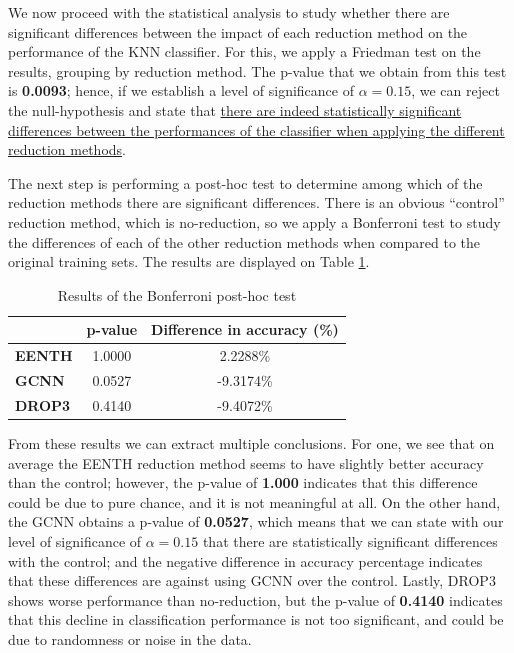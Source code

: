 We now proceed with the statistical analysis to study whether there are significant differences between the impact of each reduction method on the performance of the KNN classifier. For this, we apply a Friedman test on the results, grouping by reduction method. The p-value that we obtain from this test is \textbf{0.0093}; hence, if we establish a level of significance of $ \alpha = 0.15 $, we can reject the null-hypothesis and state that \uline{there are indeed statistically significant differences between the performances of the classifier when applying the different reduction methods}.

The next step is performing a post-hoc test to determine among which of the reduction methods there are significant differences. There is an obvious ``control'' reduction method, which is no-reduction, so we apply a Bonferroni test to study the differences of each of the other reduction methods when compared to the original training sets. The results are displayed on Table \ref{tab:knn:hep:red-posthoc}.

\begin{table}[h!]
    \centering
    \small
    \begin{tabular}{|l|c|c|}
    \hline
                             & \textbf{p-value} & \textbf{Difference in accuracy (\%)} \\ \hline
    \textbf{EENTH} & 1.0000           & 2.2288\%          \\ \hline
    \textbf{GCNN}           & 0.0527           & -9.3174\%          \\ \hline
    \textbf{DROP3}           & 0.4140           & -9.4072\%          \\ \hline
    \end{tabular}
    \caption{Results of the Bonferroni post-hoc test}
    \label{tab:knn:hep:red-posthoc}
\end{table}

From these results we can extract multiple conclusions. For one, we see that on average the EENTH reduction method seems to have slightly better accuracy than the control; however, the p-value of \textbf{1.000} indicates that this difference could be due to pure chance, and it is not meaningful at all. On the other hand, the GCNN obtains a p-value of \textbf{0.0527}, which means that we can state with our level of significance of $ \alpha = 0.15 $ that there are statistically significant differences with the control; and the negative difference in accuracy percentage indicates that these differences are against using GCNN over the control. Lastly, DROP3 shows worse performance than no-reduction, but the p-value of \textbf{0.4140} indicates that this decline in classification performance is not too significant, and could be due to randomness or noise in the data.

